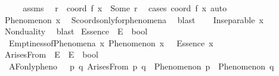\begin{isabellebody}
\isamarkupfalse%
\ {\isacharminus}{\kern0pt}\isanewline
\ \ \isamarkupfalse%
\ assms\ \isamarkupfalse%
\ r\ \ {\isachardoublequoteopen}coord\ f\ x\ {\isacharequal}{\kern0pt}\ Some\ r{\isachardoublequoteclose}\ \isamarkupfalse%
\ {\isacharparenleft}{\kern0pt}cases\ {\isachardoublequoteopen}coord\ f\ x{\isachardoublequoteclose}{\isacharparenright}{\kern0pt}\ auto\isanewline
\ \ \isamarkupfalse%
\ {\isachardoublequoteopen}Phenomenon\ x{\isachardoublequoteclose}\ \isamarkupfalse%
\ S{}{\isacharunderscore}{\kern0pt}coords{\isacharunderscore}{\kern0pt}only{\isacharunderscore}{\kern0pt}for{\isacharunderscore}{\kern0pt}phenomena\ \isamarkupfalse%
\ blast\isanewline
\ \ \isamarkupfalse%
\ {\isachardoublequoteopen}Inseparable\ x\ {\isasymOmega}{\isachardoublequoteclose}\ \isamarkupfalse%
\ Nonduality\ \isamarkupfalse%
\ blast\isanewline
{}\isamarkupfalse%
%
\endisatagproof
{\isafoldproof}%
%
\isadelimproof
%
\endisadelimproof
%
\isadelimdocument
%
\endisadelimdocument
%
\isatagdocument
%
\isamarkuptrue%
%
\endisatagdocument
{\isafolddocument}%
%
\isadelimdocument
%
\endisadelimdocument
{}\isamarkupfalse%
\ Essence\ {\isacharcolon}{\kern0pt}{\isacharcolon}{\kern0pt}\ {\isachardoublequoteopen}E\ {\isasymRightarrow}\ bool{\isachardoublequoteclose}\isanewline
\isanewline
{}\isamarkupfalse%
\ \isanewline
\ \ Emptiness{\isacharunderscore}{\kern0pt}of{\isacharunderscore}{\kern0pt}Phenomena{\isacharcolon}{\kern0pt}\ {\isachardoublequoteopen}{\isasymforall}x{\isachardot}{\kern0pt}\ Phenomenon\ x\ {\isasymlongrightarrow}\ {\isasymnot}\ Essence\ x{\isachardoublequoteclose}%
\isadelimdocument
%
\endisadelimdocument
%
\isatagdocument
%
\isamarkuptrue%
%
\endisatagdocument
{\isafolddocument}%
%
\isadelimdocument
%
\endisadelimdocument
{}\isamarkupfalse%
\ ArisesFrom\ {\isacharcolon}{\kern0pt}{\isacharcolon}{\kern0pt}\ {\isachardoublequoteopen}E\ {\isasymRightarrow}\ E\ {\isasymRightarrow}\ bool{\isachardoublequoteclose}\ \ \ \isanewline
\isanewline
{}\isamarkupfalse%
\ \isanewline
\ \ AF{\isacharunderscore}{\kern0pt}only{\isacharunderscore}{\kern0pt}pheno{\isacharcolon}{\kern0pt}\ \ \ {\isachardoublequoteopen}{\isasymforall}p\ q{\isachardot}{\kern0pt}\ ArisesFrom\ p\ q\ {\isasymlongrightarrow}\ Phenomenon\ p\ {\isasymand}\ Phenomenon\ q{\isachardoublequoteclose}\ \isanewline

\end{isabellebody}
